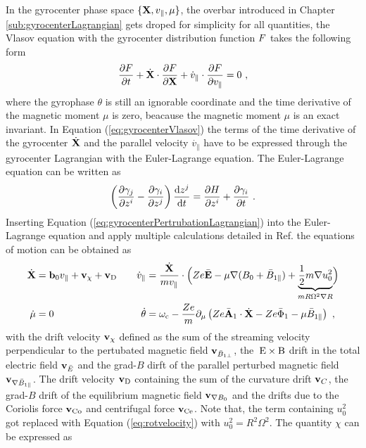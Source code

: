 In the gyrocenter phase space $\{\boldsymbol{\mathbf{X}}, v_\parallel, \mu\}$, the overbar introduced in Chapter \ref{sub:gyrocenterLagrangian} gets droped for simplicity for all quantities, the Vlasov equation with the gyrocenter distribution function $F$ takes the following form
\begin{gather}
	\frac{\partial F}{\partial t} + \dot{\boldsymbol{\mathbf{X}}} \cdot \frac{\partial F}{\partial \boldsymbol{\mathbf{X}}} + \dot{v}_\parallel \cdot \frac{\partial F}{\partial v_\parallel} = 0~,
	\label{eq:gyrocenterVlasov}
\end{gather}
where the gyrophase $\theta$ is still an ignorable coordinate and the time derivative of the magnetic moment $\mu$ is zero, beacause the magnetic moment $\mu$ is an exact invariant. In Equation (\ref{eq:gyrocenterVlasov}) the terms of the time derivative of the gyrocenter $\dot{\boldsymbol{\mathbf{X}}}$ and the parallel velocity $\dot{v_\parallel}$ have to be expressed through the gyrocenter Lagrangian with the Euler-Lagrange equation. The Euler-Lagrange equation can be written as 
\begin{gather}
	\left(\frac{\partial \gamma_j}{\partial z^i} - \frac{\partial \gamma_i}{\partial z^j}\right) \frac{\mathrm{d}z^j}{\mathrm{d}t} = \frac{\partial H}{\partial z^i} + \frac{\partial \gamma_i}{\partial t}~.
	\label{eq:eulerLagrange}
\end{gather}
Inserting Equation (\ref{eq:gyrocenterPertrubationLagrangian}) into the Euler-Lagrange equation and apply multiple calculations detailed in Ref.  the equations of motion can be obtained as
\begin{gather}
	\begin{aligned}
		\dot{\boldsymbol{\mathbf{X}}} &= \boldsymbol{\mathbf{b}}_0v_\parallel + \boldsymbol{\mathbf{v}}_\chi + \boldsymbol{\mathbf{v}}_\mathrm{D} &\quad \dot{v}_\parallel &= \frac{\dot{\boldsymbol{\mathbf{X}}}}{mv_\parallel} \cdot \Bigl( Ze \bar{\boldsymbol{\mathbf{E}}} -\mu\nabla (B_0 + \bar{B}_{1\parallel}) + \underbrace{\frac{1}{2} m \nabla u_0^2}_{mR \Omega^2 \nabla R} \Bigr) \\
		\dot{\mu} &= 0  &\quad \dot{\theta} &= \omega_\mathrm{c} - \frac{Ze}{m} \partial_\mu \left(Ze\bar{\boldsymbol{\mathbf{A}}}_1 \cdot \dot{\boldsymbol{\mathbf{X}}} - Ze\bar{\Phi}_1 - \mu\bar{B}_{1\parallel}\right)~,
	\end{aligned}
	\label{eq:motionEquation}
\end{gather}
with the drift velocity $\boldsymbol{\mathbf{v}}_\chi$ defined as the sum of the streaming velocity perpendicular to the pertubated magnetic field $\boldsymbol{\mathbf{v}}_{\bar{B}_{1\perp}}$, the $\mathrm{\:E}\times\mathrm{B}$ drift in the total electric field $\boldsymbol{\mathbf{v}}_{\bar{E}}$ and the grad-$B$ dirft of the parallel perturbed magnetic field $\boldsymbol{\mathbf{v}}_{\nabla \bar{B}_{1\parallel}}$. The drift velocity $\boldsymbol{\mathbf{v}}_\mathrm{D}$ containing the sum of the curvature drift $\boldsymbol{\mathbf{v}}_C$, the grad-$B$ drift of the equilibrium magnetic field $\boldsymbol{\mathbf{v}}_{\nabla B_0}$ and the drifts due to the Coriolis force $\boldsymbol{\mathbf{v}}_\mathrm{Co}$ and centrifugal force $\boldsymbol{\mathbf{v}}_\mathrm{Ce}$. Note that, the term containing $u_0^2$ got replaced with Equation (\ref{eq:rotvelocity}) with $u_0^2 = R^2 \Omega^2$. The quantity $\chi$ can be expressed as
